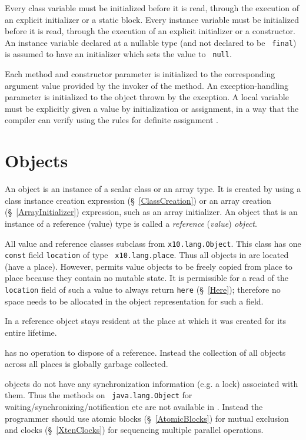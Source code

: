 Every class variable must be initialized before it is read, through
the execution of an explicit initializer or a static block. Every
instance variable must be initialized before it is read, through the
execution of an explicit initializer or a constructor.  An instance
variable declared at a nullable type (and not declared to be {\tt
final}) is assumed to have an initializer which sets the value to {\tt
null}.

Each method and constructor parameter is initialized to the
corresponding argument value provided by the invoker of the method. An
exception-handling parameter is initialized to the object thrown by
the exception. A local variable must be explicitly given a value by
initialization or assignment, in a way that the compiler can verify
using the rules for definite assignment \cite[\S~16]{jls2}.

\cbend

\section{Objects}\label{XtenObjects}

An object is an instance of a scalar class or an array type.  It is
created by using a class instance creation expression
(\S~\ref{ClassCreation}) or an array creation
(\S~\ref{ArrayInitializer}) expression, such as an array
initializer. An object that is an instance of a reference (value) type
is called a {\em reference} ({\em value}) {\em object}.

All value and reference classes subclass from {\tt x10.lang.Object}.
This class has one {\tt const} field {\tt location} of type {\tt
x10.lang.place}.  Thus all objects in \Xten{}
are located (have a place). However, \Xten{} permits value objects to
be freely copied from place to place because they contain no mutable
state.  It is permissible for a read of the {\tt location} field of
such a value to always return {\tt here} (\S~\ref{Here});
therefore no space needs to be allocated in the object representation
for such a field.

In \XtenCurrVer{} a reference object stays resident at the place at
which it was created for its entire lifetime.

{}\Xten{} has no operation to dispose of a reference.  Instead the
collection of all objects across all places is globally garbage
collected.

{}\Xten{} objects do not have any synchronization information (e.g.{}
a lock) associated with them. Thus the methods on {\tt
java.lang.Object} for waiting/synchronizing/notification etc are not
available in \Xten. Instead the programmer should use atomic blocks
(\S~\ref{AtomicBlocks}) for mutual exclusion and clocks
(\S~\ref{XtenClocks}) for sequencing multiple parallel operations.

